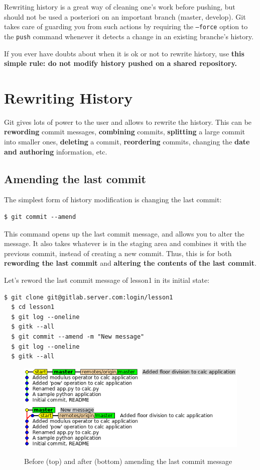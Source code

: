 \documentclass{../common/tufte-latex/tufte-handout}
\begin{document}
Rewriting history is a great way of cleaning one's work before pushing, but should not be used a posteriori on an important branch (master, develop).  Git takes care of guarding you from such actions by requiring the \texttt{--force} option to the \texttt{push} command whenever it detects a change in an existing branche's history.

If you ever have doubts about when it is ok or not to rewrite history, use \textbf{this simple rule: do not modify history pushed on a shared repository.}

\section{Rewriting History}
Git gives lots of power to the user and allows to rewrite the history.
This can be \textbf{rewording} commit messages, \textbf{combining} commits, \textbf{splitting} a large commit into smaller ones, \textbf{deleting} a commit, \textbf{reordering} commits, changing the \textbf{date and authoring} information, etc.

\subsection{Amending the last commit}
The simplest form of history modification is changing the last commit:

\begin{lstlisting}[style=BashInputStyle]
  $ git commit --amend
\end{lstlisting}

This command opens up the last commit message, and allows you to alter the message.
It also takes whatever is in the staging area and combines it with the previous commit, instead of creating a new commit.
Thus, this is for both \textbf{rewording the last commit} and \textbf{altering the contents of the last commit}.

Let's reword the last commit message of lesson1 in its initial state:

\begin{lstlisting}[style=BashInputStyle]
  $ git clone git@gitlab.server.com:login/lesson1
  $ cd lesson1
  $ git log --oneline
  $ gitk --all
  $ git commit --amend -m "New message"
  $ git log --oneline
  $ gitk --all
\end{lstlisting}

\begin{figure}%
  \centering
  \includegraphics[width=0.85\linewidth]{gitcommit-amend.png}
  \label{fig:gitcommit-amend}
  \caption{Before (top) and after (bottom) amending the last commit message}
\end{figure}
\end{document}
